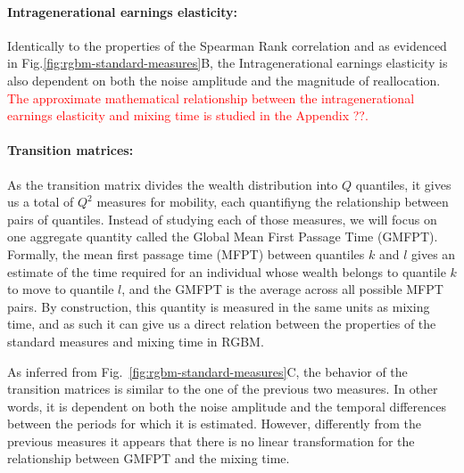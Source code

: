 \documentclass[11pt]{article}
\newcommand{\ie}{{\it i.e.}\xspace}
\numberwithin{equation}{section}
\begin{document}
\paragraph{Intragenerational earnings elasticity:} 
Identically to the properties of the Spearman Rank correlation and as evidenced in Fig.\ref{fig:rgbm-standard-measures}B, the Intragenerational earnings elasticity is also dependent on both the noise amplitude and the magnitude of reallocation. \textcolor{red}{The approximate mathematical relationship between the intragenerational earnings elasticity and mixing time is studied in the Appendix ??.}



\paragraph{Transition matrices:} As the transition matrix divides the wealth distribution into $Q$ quantiles, it gives us a total of $Q^2$ measures for mobility, each quantifiyng the relationship between pairs of quantiles. Instead of studying each of those measures, we will focus on one aggregate quantity called the Global Mean First Passage Time (GMFPT). Formally, the mean first passage time (MFPT) between quantiles $k$ and $l$ gives an estimate of the time required for an individual whose wealth belongs to quantile $k$ to move to quantile $l$, and the GMFPT is the average across all possible MFPT pairs. By construction, this quantity is measured in the same units as mixing time, and as such it can give us a direct relation between the properties of the standard measures and mixing time in RGBM.

As inferred from Fig.~\ref{fig:rgbm-standard-measures}C, the behavior of the transition matrices is similar to the one of the previous two measures. In other words, it is dependent on both the noise amplitude and the temporal differences between the periods for which it is estimated. However, differently from the previous measures it appears that there is no linear transformation for the relationship between GMFPT and the mixing time. 
\end{document}
